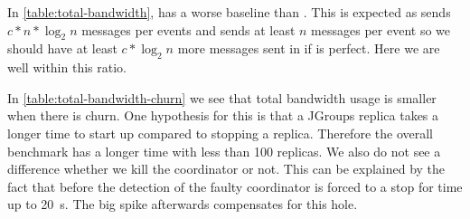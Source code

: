 %	
In \autoref{table:total-bandwidth}, \epto has a worse baseline than \jgroups. This is expected as \epto sends $c*n*\log_2 n$ messages per events and \jgroups sends at least $n$ messages per event so we should have at least $c*\log_2 n$ more messages sent in \epto if \jgroups is perfect. Here we are well within this ratio.
\begin{table}[hpt]
	\centering
	\caption{Total \si{\giga\byte} sent/received with a synthetic churn}
	\label{table:total-bandwidth-churn} 
\end{table}

%	
In \autoref{table:total-bandwidth-churn} we see that \jgroups total bandwidth usage is smaller when there is churn. One hypothesis for this is that a JGroups replica takes a longer time to start up compared to stopping a replica. Therefore the overall benchmark has a longer time with less than 100 replicas. We also do not see a difference whether we kill the coordinator or not. This can be explained by the fact that before the detection of the faulty coordinator \jgroups is forced to a stop for time up to \SI{20}{\second}. The big spike afterwards compensates for this hole.
